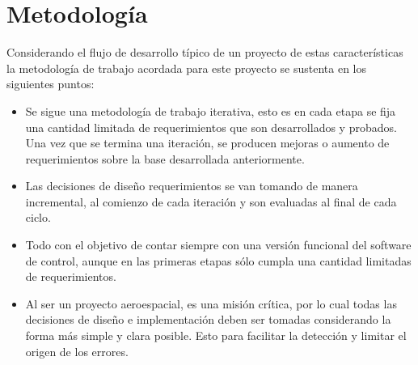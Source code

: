 \documentclass[11pt,letterpaper]{article}
\begin{document}
\newpage
\section{Metodología}

Considerando el flujo de desarrollo típico de un proyecto de estas características la metodología de trabajo acordada para este proyecto se sustenta en los siguientes puntos:

\begin{itemize}
	\item Se sigue una metodología de trabajo iterativa, esto es en cada etapa se fija una cantidad limitada de requerimientos que son desarrollados y probados. Una vez que se termina una iteración, se producen mejoras o aumento de requerimientos sobre la base desarrollada anteriormente.
	
	\item Las decisiones de diseño  requerimientos se van tomando de manera incremental, al comienzo de cada iteración y son evaluadas al final de cada ciclo.
	
	\item Todo con el objetivo de contar siempre con una versión funcional del software de control, aunque en las primeras etapas sólo cumpla una cantidad limitadas de requerimientos.
	
	\item Al ser un proyecto aeroespacial, es una misión crítica, por lo cual todas las decisiones de diseño e implementación deben ser tomadas considerando la forma más simple y clara posible. Esto para facilitar la detección y limitar el origen de los errores.
	
\end{itemize}


% 	
\end{document}
